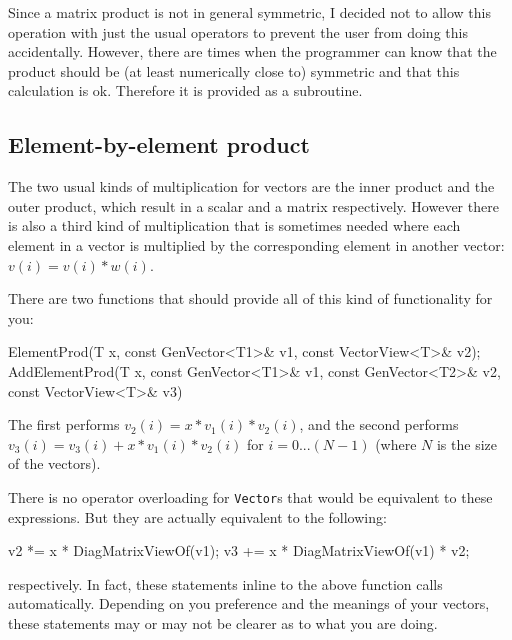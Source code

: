 \documentclass[twoside,letterpaper,11pt]{article}
\renewcommand{\tt}[1]{{\lstinline {#1}}}
\begin{document}
Since a matrix product is not in general symmetric, I decided not to allow 
this operation with just the usual operators to prevent the user from doing 
this accidentally.  However, there are times when the 
programmer can know that the product should be (at least numerically close to)
symmetric and that this calculation is ok.  Therefore it is provided as a subroutine.

\subsection{Element-by-element product}

The two usual kinds of multiplication for vectors are the inner product and 
the outer product, which result in a scalar and a matrix respectively.
However there is also a third kind of multiplication that is sometimes needed where
each element in a vector is multiplied by the
corresponding element in another vector: $v(i) = v(i) * w(i)$.

There are two functions that should provide all of this kind of functionality
for you:
\begin{tmvcode}
ElementProd(T x, const GenVector<T1>& v1, const VectorView<T>& v2);
AddElementProd(T x, const GenVector<T1>& v1, const GenVector<T2>& v2,
      const VectorView<T>& v3)
\end{tmvcode}
The first performs $v_2(i) = x * v_1(i) * v_2(i)$, and the second performs
$v_3(i) = v_3(i) + x * v_1(i) * v_2(i)$ for $i = 0 ... (N-1)$ (where $N$ is the 
size of the vectors).

There is no operator overloading for \tt{Vector}s that would be equivalent to 
these expressions.
But they are actually equivalent to the following:
\begin{tmvcode}
v2 *= x * DiagMatrixViewOf(v1);
v3 += x * DiagMatrixViewOf(v1) * v2;
\end{tmvcode}
respectively.  In fact, these statements inline to the above function calls
automatically.  Depending on you preference and the meanings of your vectors,
these statements may or may not be clearer as to what you are doing.
\end{document}
